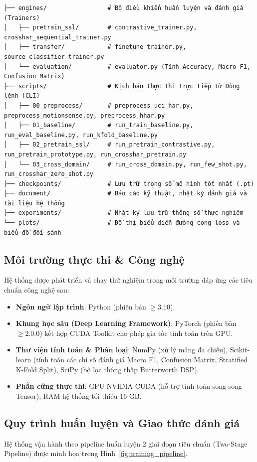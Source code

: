 \begin{verbatim}
├── engines/                 # Bộ điều khiển huấn luyện và đánh giá (Trainers)
│   ├── pretrain_ssl/        # contrastive_trainer.py, crosshar_sequential_trainer.py
│   ├── transfer/            # finetune_trainer.py, source_classifier_trainer.py
│   └── evaluation/          # evaluator.py (Tính Accuracy, Macro F1, Confusion Matrix)
├── scripts/                 # Kịch bản thực thi trực tiếp từ Dòng lệnh (CLI)
│   ├── 00_preprocess/       # preprocess_uci_har.py, preprocess_motionsense.py, preprocess_hhar.py
│   ├── 01_baseline/         # run_train_baseline.py, run_eval_baseline.py, run_kfold_baseline.py
│   ├── 02_pretrain_ssl/     # run_pretrain_contrastive.py, run_pretrain_prototype.py, run_crosshar_pretrain.py
│   └── 03_cross_domain/     # run_cross_domain.py, run_few_shot.py, run_crosshar_zero_shot.py
├── checkpoints/             # Lưu trữ trọng số mô hình tốt nhất (.pt)
├── document/                # Báo cáo kỹ thuật, nhật ký đánh giá và tài liệu hệ thống
├── experiments/             # Nhật ký lưu trữ thông số thực nghiệm
└── plots/                   # Đồ thị biểu diễn đường cong loss và biểu đồ đối sánh
\end{verbatim}

\subsection{Môi trường thực thi \& Công nghệ}
Hệ thống được phát triển và chạy thử nghiệm trong môi trường đáp ứng các tiêu chuẩn công nghệ sau:
\begin{itemize}
    \item \textbf{Ngôn ngữ lập trình}: Python (phiên bản $\ge 3.10$).
    \item \textbf{Khung học sâu (Deep Learning Framework)}: PyTorch (phiên bản $\ge 2.0.0$) kết hợp CUDA Toolkit cho phép gia tốc tính toán trên GPU.
    \item \textbf{Thư viện tính toán \& Phân loại}: NumPy (xử lý mảng đa chiều), Scikit-learn (tính toán các chỉ số đánh giá Macro F1, Confusion Matrix, Stratified K-Fold Split), SciPy (bộ lọc thông thấp Butterworth DSP).
    \item \textbf{Phần cứng thực thi}: GPU NVIDIA CUDA (hỗ trợ tính toán song song Tensor), RAM hệ thống tối thiểu 16 GB.
\end{itemize}

\subsection{Quy trình huấn luyện và Giao thức đánh giá}
Hệ thống vận hành theo pipeline huấn luyện 2 giai đoạn tiêu chuẩn (Two-Stage Pipeline) được minh họa trong Hình~\ref{fig:training_pipeline}.

